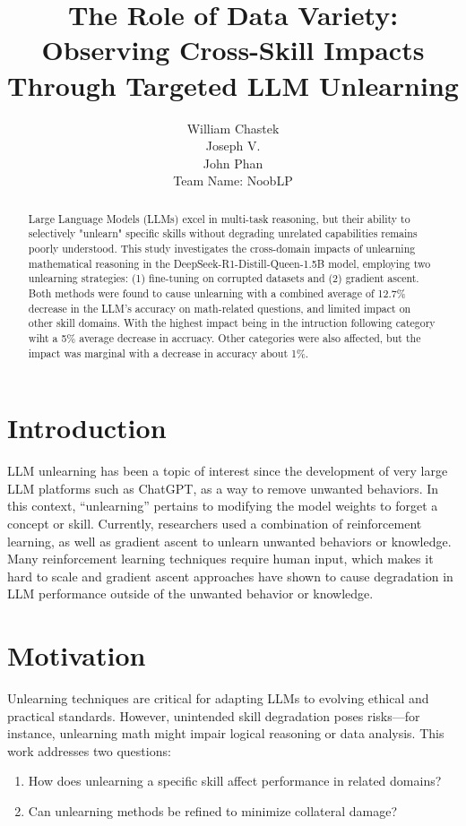 \documentclass[10.5pt]{article}
\title{The Role of Data Variety: Observing Cross-Skill Impacts Through Targeted LLM Unlearning}
\author{William Chastek \\ Joseph V. \\ John Phan \\
Team Name: NoobLP}
\begin{document}
\maketitle

\begin{abstract}
Large Language Models (LLMs) excel in multi-task reasoning, but their ability to selectively "unlearn" specific skills without degrading unrelated capabilities remains poorly understood. This study investigates the cross-domain impacts of unlearning mathematical reasoning in the DeepSeek-R1-Distill-Queen-1.5B model, employing two unlearning strategies: (1) fine-tuning on corrupted datasets and (2) gradient ascent. Both methods were found to cause unlearning with a combined average of 12.7\% decrease in the LLM's accuracy on math-related questions, and limited impact on other skill domains. With the highest impact being in the intruction following category wiht a 5\% average decrease in accruacy. Other categories were also affected, but the impact was marginal with a decrease in accuracy about 1\%.
\end{abstract}

\section{Introduction}
LLM unlearning has been a topic of interest since the development of very large LLM platforms such as ChatGPT, as a way to remove unwanted behaviors. In this context, “unlearning” pertains to modifying the model weights to forget a concept or skill. Currently, researchers used a combination of reinforcement learning\cite{mu2024rule}, as well as gradient ascent\cite{neel2020descenttodeletegradientbasedmethodsmachine} to unlearn unwanted behaviors or knowledge. Many reinforcement learning techniques require human input, which makes it hard to scale and gradient ascent approaches have shown to cause degradation in LLM performance outside of the unwanted behavior or knowledge. 

\section{Motivation}
Unlearning techniques are critical for adapting LLMs to evolving ethical and practical standards. However, unintended skill degradation poses risks—for instance, unlearning math might impair logical reasoning or data analysis. This work addresses two questions:
\begin{enumerate}
    \item How does unlearning a specific skill affect performance in related domains?
    \item Can unlearning methods be refined to minimize collateral damage?
\end{enumerate}
\end{document}
